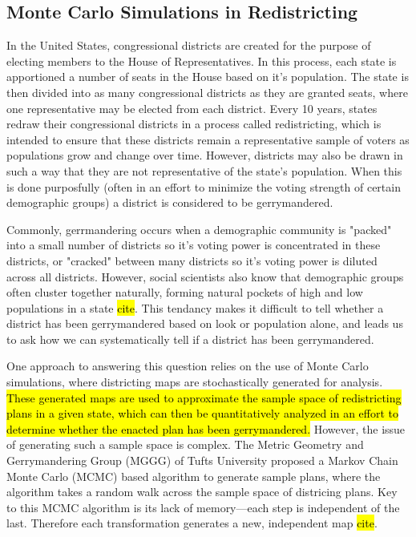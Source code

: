 \documentclass{article}
\begin{document}
\subsection{Monte Carlo Simulations in Redistricting}
\par 
In the United States, congressional districts are created for the purpose of electing members to the House of Representatives. In this process, each state is apportioned a number of seats in the House based on it's population. The state is then divided into as many congressional districts as they are granted seats, where one representative may be elected from each district. Every 10 years, states redraw their congressional districts in a process called redistricting, which is intended to ensure that these districts remain a representative sample of voters as populations grow and change over time. However, districts may also be drawn in such a way that they are not representative of the state's population. When this is done purposfully (often in an effort to minimize the voting strength of certain demographic groups) a district is considered to be gerrymandered.
\par
Commonly, gerrmandering occurs when a demographic community is "packed" into a small number of districts so it's voting power is concentrated in these districts, or "cracked" between many districts so it's voting power is diluted across all districts. However, social scientists also know that demographic groups often cluster together naturally, forming natural pockets of high and low populations in a state \hl{cite}. This tendancy makes it difficult to tell whether a district has been gerrymandered based on look or population alone, and leads us to ask how we can systematically tell if a district has been gerrymandered. 
\par
One approach to answering this question relies on the use of Monte Carlo simulations, where districting maps are stochastically generated for analysis. \hl{These generated maps are used to approximate the sample space of redistricting plans in a given state, which can then be quantitatively analyzed in an effort to determine whether the enacted plan has been gerrymandered.} However, the issue of generating such a sample space is complex. The Metric Geometry and Gerrymandering Group (MGGG) of Tufts University proposed a Markov Chain Monte Carlo (MCMC) based algorithm to generate sample plans, where the algorithm takes a random walk across the sample space of districing plans. Key to this MCMC algorithm is its lack of memory—each step is independent of the last. Therefore each transformation generates a new, independent map \hl{cite}. 
\end{document}
